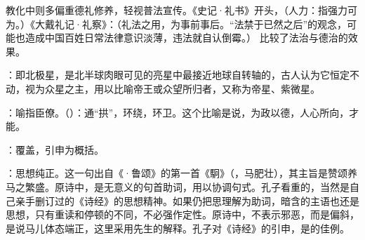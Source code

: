 {{教化中则多偏重德礼修养，轻视普法宣传。《史记·礼书》开头，（人力：指强力可为。）《大戴礼记·礼察》：（礼法之用，为事前事后。“法禁于已然之后”的观念，可能也造成中国百姓日常法律意识淡薄，违法就自认倒霉。） 比较了法治与德治的效果。
}

\item {}：即北极星，是北半球肉眼可见的亮星中最接近地球自转轴的，古人认为它恒定不动，视为众星之主，用以比喻帝王或众望所归者，又称为帝星、紫微星。

\item {}：喻指臣僚。（）：通“拱”，环绕，环卫。这个比喻是说，为政以德，人心所向，才能。
}
{}


{
\item {}：覆盖，引申为概括。
\item {}：思想纯正。这一句出自《·鲁颂》的第一首《駉》（，马肥壮），其主旨是赞颂养马之繁盛。原诗中，是无意义的句首助词，用以协调句式。孔子看重的，当然是自己亲手删订过的《诗经》的思想精神。如果仍把思理解为助词，暗含的主语也还是思想，只有重读和停顿的不同，不必强作定性。原诗中，不表示邪恶，而是偏斜，是说马儿体态端正，这里采用先生的解释。孔子对《诗经》的引申，是的佳例。
}
{}


